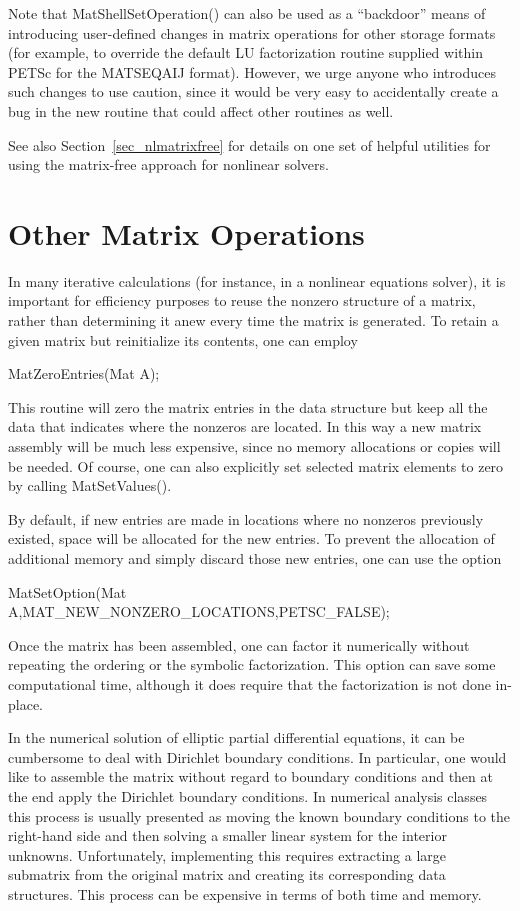 Note that MatShellSetOperation() can also be used as a
``backdoor'' means of introducing user-defined changes in matrix
operations for other storage formats (for example, to override the
default LU factorization routine supplied within PETSc for the
MATSEQAIJ format).  However, we urge anyone who introduces such
changes to use caution, since it would be very easy to
accidentally create a bug in the new routine that could affect
other routines as well.

See also Section~\ref{sec_nlmatrixfree} for details on one set of
helpful utilities for using the matrix-free approach for nonlinear
solvers.

\section{Other Matrix Operations}
\label{sec_othermat}

In many iterative calculations (for instance, in a nonlinear equations
solver), it is important for efficiency purposes to reuse the nonzero
structure of a matrix, rather than determining it anew every time
the matrix is generated.  To retain a given matrix but reinitialize
its contents, one can employ
\begin{tabbing}
  MatZeroEntries(Mat A);
\end{tabbing}
This routine will zero the matrix entries in the
data structure but keep all the data that indicates where the nonzeros
are located.  In this way a new matrix assembly will be much less
expensive, since no memory allocations or copies will be needed.
Of course, one can also explicitly set selected matrix elements to zero
by calling MatSetValues().

By default, if new entries are made in locations where no nonzeros
previously existed, space will be allocated for the new entries.
To prevent the allocation of additional memory and simply discard those
new entries, one can use the option
\begin{tabbing}
  MatSetOption(Mat A,MAT\_NEW\_NONZERO\_LOCATIONS,PETSC\_FALSE);
\end{tabbing}
Once the matrix has been assembled, one can factor it numerically
without repeating the ordering or the symbolic factorization.
This option can save some computational time, although it
does require that the factorization is not done in-place.

In the numerical solution of elliptic partial differential equations,
it can be cumbersome to deal with Dirichlet boundary
 conditions. In
particular, one would like to assemble the matrix without regard to
boundary conditions and then at the end apply the Dirichlet boundary
conditions.
In numerical analysis classes this process is usually presented as moving the
known boundary conditions to the right-hand side and then solving a smaller
linear system for the interior unknowns. Unfortunately, implementing this
requires extracting a large submatrix from the original matrix and
creating its corresponding data structures. This process can be expensive
in terms of both time and memory.

